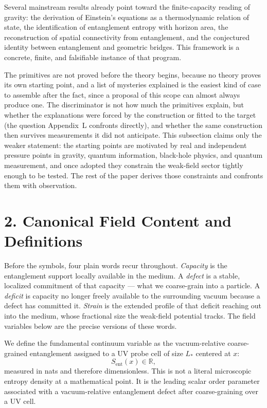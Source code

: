 \documentclass[11pt]{article}
\begin{document}
Several mainstream results already point toward the finite-capacity reading of gravity: the derivation of Einstein's equations as a thermodynamic relation of state, the identification of entanglement entropy with horizon area, the reconstruction of spatial connectivity from entanglement, and the conjectured identity between entanglement and geometric bridges. This framework is a concrete, finite, and falsifiable instance of that program.

The primitives are not proved before the theory begins, because no theory proves its own starting point, and a list of mysteries explained is the easiest kind of case to assemble after the fact, since a proposal of this scope can almost always produce one. The discriminator is not how much the primitives explain, but whether the explanations were forced by the construction or fitted to the target (the question Appendix~L confronts directly), and whether the same construction then survives measurements it did not anticipate. This subsection claims only the weaker statement: the starting points are motivated by real and independent pressure points in gravity, quantum information, black-hole physics, and quantum measurement, and once adopted they constrain the weak-field sector tightly enough to be tested. The rest of the paper derives those constraints and confronts them with observation.

\section{2. Canonical Field Content and Definitions}

Before the symbols, four plain words recur throughout. \emph{Capacity} is the entanglement support locally available in the medium. A \emph{defect} is a stable, localized commitment of that capacity --- what we coarse-grain into a particle. A \emph{deficit} is capacity no longer freely available to the surrounding vacuum because a defect has committed it. \emph{Strain} is the extended profile of that deficit reaching out into the medium, whose fractional size the weak-field potential tracks. The field variables below are the precise versions of these words.

We define the fundamental continuum variable as the vacuum-relative coarse-grained entanglement assigned to a UV probe cell of size $L_*$ centered at $x$:
\[
S_{\mathrm{ent}}(x)\in \mathbb{R},
\]
measured in nats and therefore dimensionless. This is not a literal microscopic entropy density at a mathematical point. It is the leading scalar order parameter associated with a vacuum-relative entanglement defect after coarse-graining over a UV cell.
\end{document}
